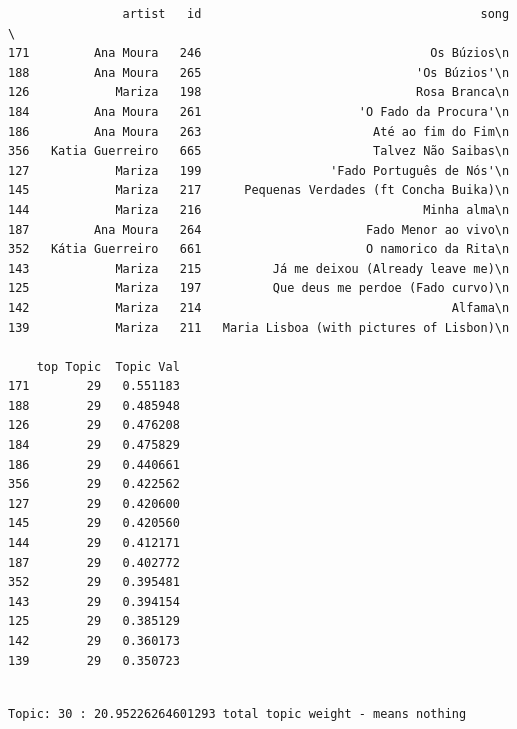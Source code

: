 \documentclass[11pt]{article}
\begin{document}
    
    \begin{verbatim}
                artist   id                                       song  \
171         Ana Moura   246                                Os Búzios\n   
188         Ana Moura   265                              'Os Búzios'\n   
126            Mariza   198                              Rosa Branca\n   
184         Ana Moura   261                      'O Fado da Procura'\n   
186         Ana Moura   263                        Até ao fim do Fim\n   
356   Katia Guerreiro   665                        Talvez Não Saibas\n   
127            Mariza   199                  'Fado Português de Nós'\n   
145            Mariza   217      Pequenas Verdades (ft Concha Buika)\n   
144            Mariza   216                               Minha alma\n   
187         Ana Moura   264                       Fado Menor ao vivo\n   
352   Kátia Guerreiro   661                       O namorico da Rita\n   
143            Mariza   215          Já me deixou (Already leave me)\n   
125            Mariza   197          Que deus me perdoe (Fado curvo)\n   
142            Mariza   214                                   Alfama\n   
139            Mariza   211   Maria Lisboa (with pictures of Lisbon)\n   

    top Topic  Topic Val  
171        29   0.551183  
188        29   0.485948  
126        29   0.476208  
184        29   0.475829  
186        29   0.440661  
356        29   0.422562  
127        29   0.420600  
145        29   0.420560  
144        29   0.412171  
187        29   0.402772  
352        29   0.395481  
143        29   0.394154  
125        29   0.385129  
142        29   0.360173  
139        29   0.350723  
    \end{verbatim}

    
    \begin{Verbatim}[commandchars=\\\{\}]

Topic: 30 : 20.95226264601293 total topic weight - means nothing

    \end{Verbatim}
\end{document}
